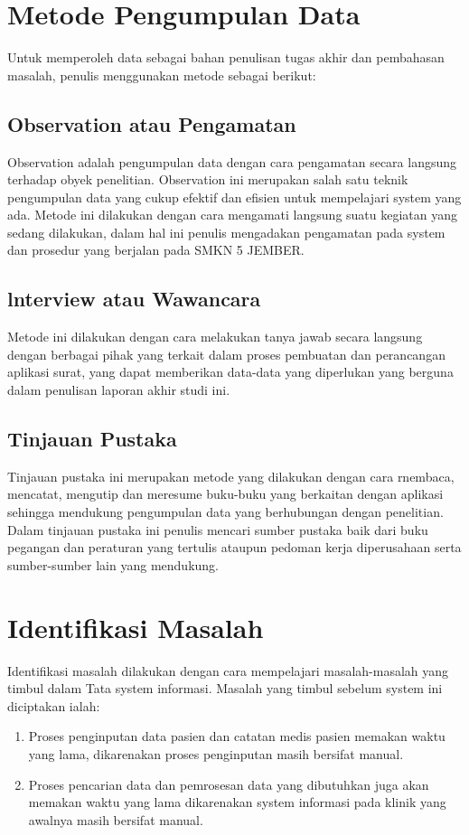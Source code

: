 \documentclass{jtetiproposalskripsi}
\begin{document}
\section{Metode Pengumpulan Data}
Untuk memperoleh data sebagai bahan penulisan tugas akhir dan pembahasan masalah, penulis menggunakan metode sebagai berikut:
\subsection{Observation atau Pengamatan}
Observation adalah pengumpulan data dengan cara pengamatan secara langsung terhadap obyek penelitian. Observation ini merupakan salah satu teknik pengumpulan data yang cukup efektif dan efisien untuk mempelajari system yang ada. Metode ini dilakukan dengan cara mengamati langsung suatu kegiatan yang sedang dilakukan, dalam hal ini penulis mengadakan pengamatan pada system dan prosedur yang berjalan pada SMKN 5 JEMBER.
\subsection{lnterview atau Wawancara}
Metode ini dilakukan dengan cara melakukan tanya jawab secara langsung dengan berbagai pihak yang terkait dalam proses pembuatan dan perancangan aplikasi surat, yang dapat memberikan data-data yang diperlukan yang berguna dalam penulisan laporan akhir studi ini.
\subsection{Tinjauan Pustaka}
Tinjauan pustaka ini merupakan metode yang dilakukan dengan cara rnembaca, mencatat, mengutip dan meresume buku-buku yang berkaitan dengan aplikasi sehingga mendukung pengumpulan data yang berhubungan dengan penelitian. Dalam tinjauan pustaka ini penulis mencari sumber pustaka baik dari buku pegangan dan peraturan yang tertulis ataupun pedoman kerja diperusahaan serta sumber-sumber lain yang mendukung.

\section{Identifikasi Masalah}
Identifikasi masalah dilakukan dengan cara mempelajari masalah-masalah yang timbul dalam Tata system informasi. Masalah yang timbul sebelum system ini diciptakan ialah: 
\begin{enumerate}
\item Proses penginputan data pasien dan catatan medis pasien memakan waktu yang lama, dikarenakan proses penginputan masih bersifat manual. 
\item Proses pencarian data dan pemrosesan data yang dibutuhkan juga akan memakan waktu yang lama dikarenakan system informasi pada klinik yang awalnya masih bersifat manual.
\end{enumerate}
\end{document}
